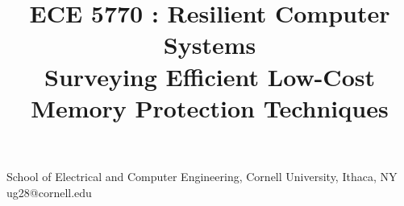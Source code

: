 \documentclass[10pt,nocopyrightspace]{sigplanconf}
\begin{document}
\renewcommand{\thesubfigure}{(\alph{subfigure})}
\title{ECE 5770 : Resilient Computer Systems \\
Surveying Efficient Low-Cost Memory Protection Techniques}

{School of Electrical and Computer Engineering, Cornell University, Ithaca, NY}
{ug28@cornell.edu}

\maketitle









\end{document}
